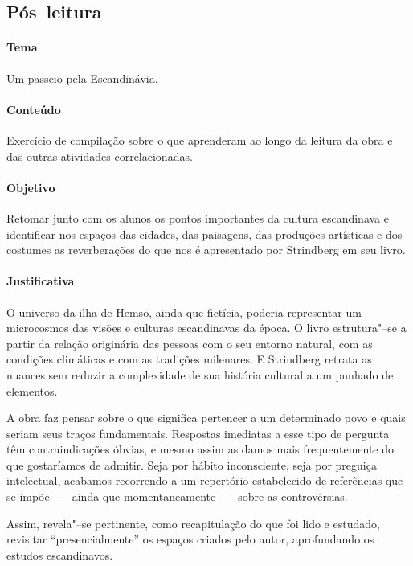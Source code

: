 \documentclass[12pt]{extarticle}
\begin{document}

\subsection{Pós--leitura}

\paragraph{Tema} Um passeio pela Escandinávia. 

\paragraph{Conteúdo} Exercício de compilação sobre o que aprenderam 
ao longo da leitura da obra e das outras 
atividades correlacionadas. 

\paragraph{Objetivo} Retomar junto com os alunos os pontos importantes da 
cultura escandinava e identificar 
nos espaços das cidades, das paisagens, das produções artísticas e dos 
costumes as reverberações do que nos 
é apresentado por Strindberg em seu livro. 

\paragraph{Justificativa} O universo da ilha de Hemsö, ainda 
que fictícia, poderia representar um microcosmos 
das visões e culturas escandinavas da época. O livro estrutura"--se a 
partir da relação originária das pessoas 
com o seu entorno natural, com as condições climáticas e com as 
tradições milenares. E Strindberg retrata 
as nuances sem reduzir a complexidade de sua história cultural 
a um punhado de elementos.

A obra faz pensar sobre o que significa pertencer a um determinado povo e 
quais seriam seus traços fundamentais. 
Respostas imediatas a esse tipo de pergunta têm contraindicações óbvias, 
e mesmo assim as damos mais frequentemente 
do que gostaríamos de admitir. Seja por hábito inconsciente, seja por 
preguiça intelectual, acabamos recorrendo a um 
repertório estabelecido de referências que se impõe —- ainda que 
momentaneamente —- sobre as controvérsias.

Assim, revela"--se pertinente, como recapitulação do que foi lido e 
estudado, revisitar ``presencialmente'' os espaços 
criados pelo autor, aprofundando os estudos escandinavos. 
\end{document}
